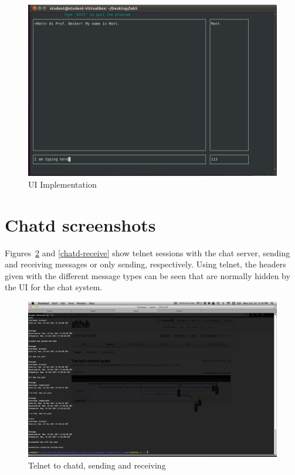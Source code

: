 \documentclass{article}
\begin{document}
\begin{figure}[!h]
\caption{UI Implementation}
\begin{center}
\includegraphics[scale=0.2]{ui.jpg}
\end{center}
\label{UI}
\end{figure}

\section*{Chatd screenshots}
Figures~\ref{chatd-send} and \ref{chatd-receive} show telnet sessions with the chat server, sending and receiving messages or only sending, respectively. Using telnet, the headers given with
the different message types can be seen that are normally hidden by the UI for the chat system.

\begin{figure}[!h]
\begin{center}
\includegraphics[scale=0.2]{send.png}
\end{center}
\caption{Telnet to chatd, sending and receiving}
\label{chatd-send}
\end{figure}
\end{document}
